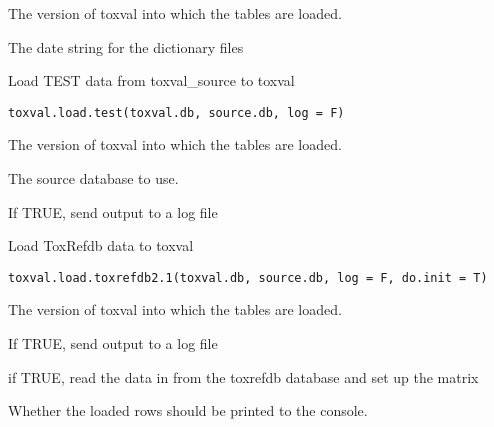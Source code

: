 \documentclass[letterpaper]{book}
\begin{document}
%
\begin{Arguments}
\begin{ldescription}
\item[\code{toxval.db}] The version of toxval into which the tables are loaded.

\item[\code{date\_string}] The date string for the dictionary files
\end{ldescription}
\end{Arguments}
%
\begin{Description}\relax
Load TEST data from toxval\_source to toxval
\end{Description}
%
\begin{Usage}
\begin{verbatim}
toxval.load.test(toxval.db, source.db, log = F)
\end{verbatim}
\end{Usage}
%
\begin{Arguments}
\begin{ldescription}
\item[\code{toxval.db}] The version of toxval into which the tables are loaded.

\item[\code{source.db}] The source database to use.

\item[\code{log}] If TRUE, send output to a log file
\end{ldescription}
\end{Arguments}
%
\begin{Description}\relax
Load ToxRefdb data to toxval
\end{Description}
%
\begin{Usage}
\begin{verbatim}
toxval.load.toxrefdb2.1(toxval.db, source.db, log = F, do.init = T)
\end{verbatim}
\end{Usage}
%
\begin{Arguments}
\begin{ldescription}
\item[\code{toxval.db}] The version of toxval into which the tables are loaded.

\item[\code{log}] If TRUE, send output to a log file

\item[\code{do.init}] if TRUE, read the data in from the toxrefdb database and set up the matrix

\item[\code{verbose}] Whether the loaded rows should be printed to the console.
\end{ldescription}
\end{Arguments}
\end{document}
